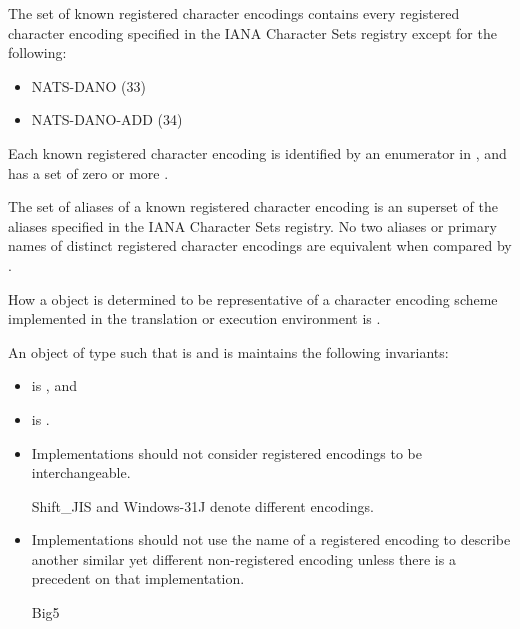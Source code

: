 \pnum
The set of known registered character encodings contains
every registered character encoding
specified in the IANA Character Sets registry except for the following:
\begin{itemize}
\item NATS-DANO (33)
\item NATS-DANO-ADD (34)
\end{itemize}

\pnum
Each known registered character encoding
is identified by an enumerator in , and
has a set of zero or more .

\pnum
The set of aliases of a known registered character encoding is an
superset of the aliases specified in the IANA Character Sets registry.
No two aliases or primary names of distinct registered character encodings
are equivalent when compared by .

\pnum
How a  object
is determined to be representative of a character encoding scheme
implemented in the translation or execution environment is
.

\pnum
An object  of type  such that
 is  and
 is 
maintains the following invariants:
\begin{itemize}
\item {} is , and
\item {} is .
\end{itemize}

\pnum
\recommended
\begin{itemize}
\item
Implementations should not consider registered encodings to be interchangeable.
\begin{example}
Shift_JIS and Windows-31J denote different encodings.
\end{example}
\item
Implementations should not use the name of a registered encoding
to describe another similar yet different non-registered encoding
unless there is a precedent on that implementation.
\begin{example}
Big5
\end{example}
\end{itemize}


